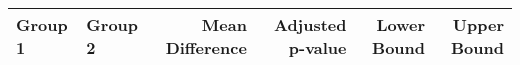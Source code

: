 \begin{tabular}{llrrrr}
\toprule
Group 1 & Group 2 & Mean Difference & Adjusted p-value & Lower Bound & Upper Bound \\
\midrule
\bottomrule
\end{tabular}
